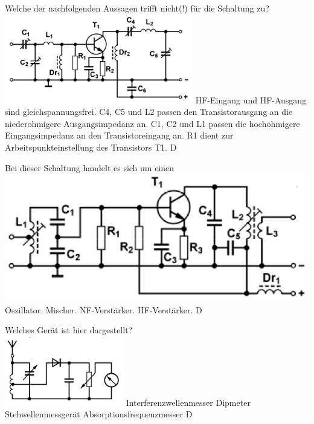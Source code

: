 {Welche der nachfolgenden Aussagen trifft nicht(!) für die Schaltung zu?\\ \includegraphics[scale=0.6]{Schaltungstechnik/Bilder/TG311.png}}%
{HF-Eingang und HF-Ausgang sind gleichspannungsfrei.}%
{C4, C5 und L2 passen den Transistorausgang an die niederohmigere Ausgangsimpedanz an.}%
{C1, C2 und L1 passen die hochohmigere Eingangsimpedanz an den Transistoreingang an.}%
{R1 dient zur Arbeitspunkteinstellung des Transistors T1.}%
{D}%

{Bei dieser Schaltung handelt es sich um einen\\ \includegraphics[scale=0.25]{Schaltungstechnik/Bilder/TG222.png}}%
{Oszillator.}%
{Mischer.}%
{NF-Verstärker.}%
{HF-Verstärker.}%
{D}%

{Welches Gerät ist hier dargestellt?\\ \includegraphics[scale=0.5]{Schaltungstechnik/Bilder/TJ601.png}}%
{Interferenzwellenmesser}%
{Dipmeter}%
{Stehwellenmessgerät}%
{Absorptionsfrequenzmesser}%
{D}%

